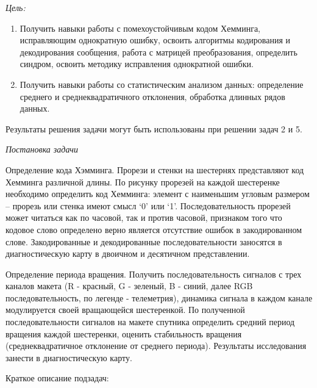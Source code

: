 
\textit{Цель:}

\begin{enumerate}
    \item Получить навыки работы с помехоустойчивым кодом Хемминга, исправляющим однократную ошибку, освоить алгоритмы кодирования и декодирования сообщения, работа с матрицей преобразования, определить синдром, освоить методику исправления однократной ошибки.
    \item Получить навыки работы со статистическим анализом данных: определение среднего и среднеквадратичного отклонения, обработка длинных рядов данных.
\end{enumerate}

Результаты решения задачи могут быть использованы при решении задач 2 и 5.

\textit{Постановка задачи}

Определение кода Хэмминга. Прорези и стенки на шестернях представляют код Хемминга различной длины. По рисунку прорезей на каждой шестеренке необходимо определить код Хемминга: элемент с наименьшим угловым размером – прорезь или стенка имеют смысл ‘0’ или ‘1’. Последовательность прорезей может читаться как по часовой, так и против часовой, признаком того что кодовое слово определено верно является отсутствие ошибок в закодированном слове. Закодированные и декодированные последовательности заносятся в диагностическую карту в двоичном и десятичном представлении.

Определение периода вращения. Получить последовательность сигналов с трех каналов макета (R - красный, G - зеленый, B - синий, далее RGB последовательность, по легенде - телеметрия), динамика сигнала в каждом канале модулируется своей вращающейся шестеренкой. По полученной последовательности сигналов на макете спутника определить средний период вращения каждой шестеренки, оценить стабильность вращения (среднеквадратичное отклонение от среднего периода). Результаты исследования занести в диагностическую карту.

Краткое описание подзадач:


